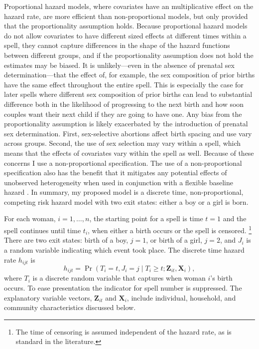 \documentclass[12pt,letterpaper]{article}
\begin{document}
Proportional hazard models, where covariates have an multiplicative 
effect on the hazard rate, are more efficient than non-proportional 
models, but only provided that the proportionality assumption holds.
Because proportional hazard models do not allow covariates to have 
different sized effects at different times within a spell,
they cannot capture differences in the shape of the hazard functions 
between different groups, and if the proportionality assumption does 
not hold the estimates may be biased.
It is unlikely---even in the absence of prenatal sex determination---that 
the effect of, for example, the sex composition of prior births have 
the same effect throughout the entire spell.
This is especially the case for later spells where different
sex composition of prior births can lead to substantial difference 
both in the likelihood of progressing to the next birth and
how soon couples want their next child if they are going to have one.
Any bias from the proportionality assumption is likely 
exacerbated by the introduction of prenatal sex determination.
First, sex-selective abortions affect birth spacing and use
vary across groups.
Second, the use of sex selection may vary within a spell, which means 
that the effects of covariates vary within the spell as well.
Because of these concerns I use a non-proportional specification.
The use of a non-proportional specification also has the benefit 
that it mitigates any potential effects of unobserved heterogeneity 
when used in conjunction with a flexible baseline hazard \citep{Dolton1995}.
In summary, my proposed model is a discrete time, non-proportional, competing risk 
hazard model with two exit states: either a boy or a girl is born.

For each woman, $i=1,\ldots,n$, the starting point for a spell is time $t=1$ and 
the spell continues until time $t_i$, when either a birth occurs or the spell 
is censored.%
\footnote{
The time of censoring is assumed independent of the hazard rate,
as is standard in the literature.
}
There are two exit states: birth of a boy, $j=1$, or birth of a girl, $j=2$, and 
$J_i$ is a random variable indicating which event took place.
The discrete time hazard rate $h_{ijt}$ is
\begin{equation}
 h_{ijt} = \Pr (T_i=t, J_i=j \mid T_i \geq t; \mathbf{Z}_{it},\mathbf{X}_{i} ),
\end{equation}
where $T_i$ is a discrete random variable that captures when woman $i$'s birth occurs.
To ease presentation the indicator for spell number is suppressed.
The explanatory variable vectors, $\mathbf{Z}_{it}$ and $\mathbf{X}_{i}$, include 
individual, household, and community characteristics discussed below.
\end{document}
